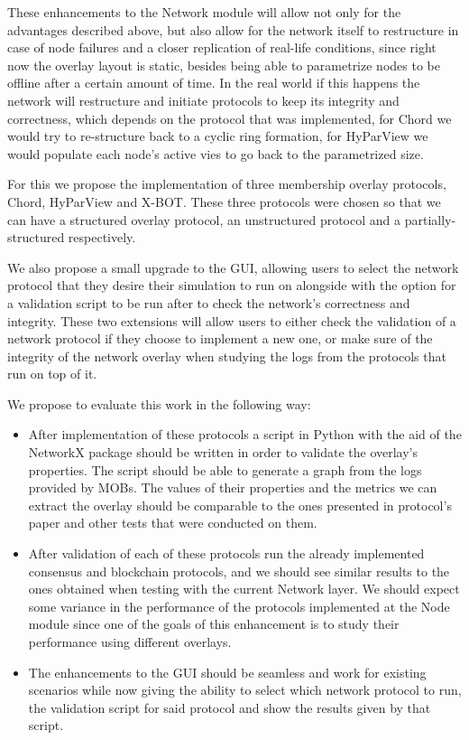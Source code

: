 These enhancements to the Network module will allow not only for the advantages
described above, but also allow for the network itself to restructure in case of
node failures and a closer replication of real-life conditions, since right now the
overlay layout is static, besides being able to parametrize nodes to be offline after
a certain amount of time. In the real world if this happens the network will restructure
and initiate protocols to keep its integrity and correctness, which depends on the
protocol that was implemented, for Chord we would try to re-structure back to a cyclic
ring formation, for HyParView we would populate each node's active vies to go back to the
parametrized size.

For this we propose the implementation of three membership overlay protocols, Chord,
HyParView and X-BOT. These three protocols were chosen so that we can have a
structured overlay protocol, an unstructured protocol and a partially-structured
respectively.

We also propose a small upgrade to the GUI, allowing users to select the network
protocol that they desire their simulation to run on alongside with the option for
a validation script to be run after to check the network's correctness and integrity.
These two extensions will allow users to either check the validation of a network
protocol if they choose to implement a new one, or make sure of the integrity of
the network overlay when studying the logs from the protocols that run on top of it.

We propose to evaluate this work in the following way:

\begin{itemize}
  \item After implementation of these protocols a script in Python with the aid of
the NetworkX package should be written in order to validate the overlay's properties.
The script should be able to generate a graph from the logs provided by MOBs.
The values of their properties and the metrics we can extract the overlay should be
comparable to the ones presented in protocol's paper and other tests that were conducted
on them.
  \item After validation of each of these protocols run the already implemented
consensus and blockchain protocols, and we should see similar results to the ones obtained
when testing with the current Network layer. We should expect some variance in the 
performance of the protocols implemented at the Node module since one of the
goals of this enhancement is to study their performance using different overlays.
  \item The enhancements to the GUI should be seamless and work for existing scenarios
while now giving the ability to select which network protocol to run, the validation
script for said protocol and show the results given by that script.
\end{itemize}

